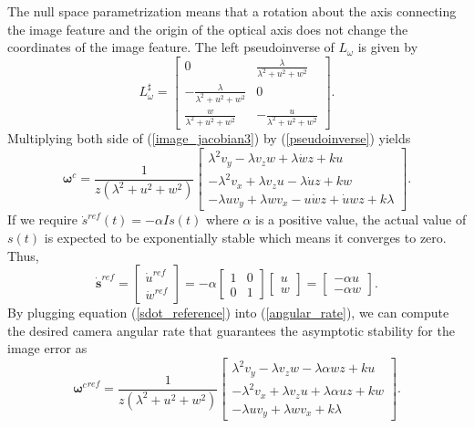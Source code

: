 The null space parametrization means that a rotation about the axis connecting the image feature and the origin of the optical axis does not change the coordinates of the image feature. The left pseudoinverse of $L_{\omega}$ is given by 
\begin{equation}
L_{\omega}^\sharp=\begin{bmatrix}
0 & \frac{\lambda}{\lambda^2+u^2+w^2} \\
-\frac{\lambda}{\lambda^2+u^2+w^2} & 0 \\
\frac{w}{\lambda^2+u^2+w^2} & -\frac{u}{\lambda^2+u^2+w^2}
\end{bmatrix}.
\label{pseudoinverse}
\end{equation}
Multiplying both side of (\ref{image_jacobian3}) by (\ref{pseudoinverse}) yields
\begin{equation}
\mathbf{\omega}^c=\frac{1}{z(\lambda^2+u^2+w^2)}\begin{bmatrix}
\lambda^2 v_y-\lambda v_z w+\lambda \dot{w}z+ku \\
-\lambda^2 v_x+\lambda v_zu-\lambda \dot{u}z+kw \\
-\lambda u v_y+\lambda w v_x-u\dot{w}z+\dot{u}wz+k\lambda
\end{bmatrix}.
\label{angular_rate}
\end{equation}
If we require $\dot{s}^{ref}(t)=-\alpha Is(t)$ where $\alpha$ is a positive value, the actual value of $s(t)$ is expected to be exponentially stable which means it converges to zero. Thus, 
\begin{equation}
\mathbf{\dot{s}}^{ref}=\begin{bmatrix}
\dot{u}^{ref} \\ \dot{w}^{ref}
\end{bmatrix}
=-\alpha \begin{bmatrix}
1 & 0 \\ 0 & 1
\end{bmatrix}
\begin{bmatrix}
u \\ w
\end{bmatrix}
=\begin{bmatrix}
-\alpha u \\ -\alpha w
\end{bmatrix}.
\label{sdot_reference}
\end{equation}
By plugging equation (\ref{sdot_reference}) into (\ref{angular_rate}), we can compute the desired camera angular rate that guarantees the asymptotic stability for the image error as
\begin{equation}
{\mathbf{\omega}^c}^{ref}=\frac{1}{z(\lambda^2+u^2+w^2)}\begin{bmatrix}
\lambda^2 v_y-\lambda v_z w -\lambda \alpha wz+ku \\
-\lambda^2 v_x+\lambda v_zu +\lambda \alpha uz+kw \\
-\lambda u v_y+\lambda w v_x +k\lambda
\end{bmatrix}.
\label{angular_rate_reference}
\end{equation}
